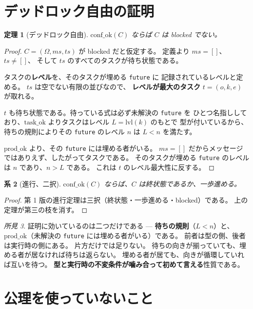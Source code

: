 \documentclass[11pt,a4paper]{ltjsarticle}
\newtheorem{theorem}{定理}
\newtheorem{corollary}[theorem]{系}
\theoremstyle{definition}
\theoremstyle{remark}
\newtheorem{finding}[theorem]{所見}
\newcommand{\Om}{\Omega}
\newcommand{\taskok}{\mathrm{task\_ok}}
\newcommand{\confok}{\mathrm{conf\_ok}}
\newcommand{\lvl}{\mathrm{lvl}}
\newcommand{\prodok}{\mathrm{prod\_ok}}
\begin{document}
\section{デッドロック自由の証明}
\label{sec:df}

\begin{theorem}[デッドロック自由]
$\confok(C)$ ならば $C$ は blocked でない。
\end{theorem}

\begin{proof}
$C = (\Om, \mathit{ms}, \mathit{ts})$ が blocked だと仮定する。
定義より $\mathit{ms} = []$、$\mathit{ts} \neq []$、
そして $\mathit{ts}$ のすべてのタスクが待ち状態である。

タスクの\textbf{レベル}を、そのタスクが埋める \texttt{future} に
記録されているレベルと定める。
$\mathit{ts}$ は空でない有限の並びなので、
\textbf{レベルが最大のタスク} $t = (o,k,e)$ が取れる。

$t$ も待ち状態である。待っている式は必ず未解決の \texttt{future} を
ひとつ名指ししており、$\taskok$ よりタスクはレベル $L = \lvl(k)$ のもとで
型が付いているから、待ちの規則によりその \texttt{future} のレベル $n$ は
$L < n$ を満たす。

$\prodok$ より、その \texttt{future} には埋める者がいる。
$\mathit{ms} = []$ だからメッセージではありえず、したがってタスクである。
そのタスクが埋める \texttt{future} のレベルは $n$ であり、$n > L$ である。
これは $t$ のレベル最大性に反する。
\end{proof}

\begin{corollary}[進行、二択]
$\confok(C)$ ならば、$C$ は終状態であるか、一歩進める。
\end{corollary}

\begin{proof}
第 1 版の進行定理は三択（終状態・一歩進める・blocked）である。
上の定理が第三の枝を消す。
\end{proof}

\begin{finding}
証明に効いているのは二つだけである --- \textbf{待ちの規則}（$L < n$）と、
\textbf{$\prodok$}（未解決の \texttt{future} には埋める者がいる）である。
前者は型の側、後者は実行時の側にある。
片方だけでは足りない。
待ちの向きが揃っていても、埋める者が居なければ待ちは返らない。
埋める者が居ても、向きが循環していれば互いを待つ。
\textbf{型と実行時の不変条件が噛み合って初めて言える}性質である。
\end{finding}

\section{公理を使っていないこと}
\end{document}
